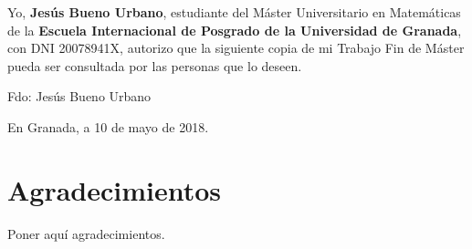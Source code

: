 Yo, \textbf{Jesús Bueno Urbano}, estudiante del Máster Universitario en Matemáticas de la \textbf{Escuela Internacional de Posgrado de la Universidad de Granada}, con DNI 20078941X, autorizo que la siguiente copia de mi Trabajo Fin de Máster pueda ser consultada por las personas que lo deseen.

\vspace{6cm}

\noindent Fdo: Jesús Bueno Urbano

\vspace{2cm}

\begin{flushright}
En Granada, a 10 de mayo de 2018.
\end{flushright}


\chapter*{Agradecimientos}
\thispagestyle{empty}

       \vspace{1cm}


Poner aquí agradecimientos.

